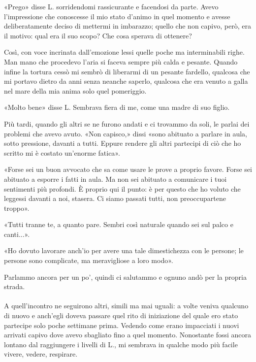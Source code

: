 \documentclass[a4paper,12pt]{book}
\begin{document}
«Prego» disse L. sorridendomi rassicurante e facendosi da parte. Avevo
l'impressione che conoscesse il mio stato d'animo in quel momento e avesse
deliberatamente deciso di mettermi in imbarazzo; quello che non capivo, però,
era il motivo: qual era il suo scopo? Che cosa sperava di ottenere?

Così, con voce incrinata dall'emozione lessi quelle poche ma interminabili
righe. Man mano che procedevo l'aria si faceva sempre più calda e pesante.
Quando infine la tortura cessò mi sembrò di liberarmi di un pesante fardello,
qualcosa che mi portavo dietro da anni senza neanche saperlo, qualcosa che era
venuto a galla nel mare della mia anima solo quel pomeriggio.

«Molto bene» disse L. Sembrava fiera di me, come una madre di suo figlio.

Più tardi, quando gli altri se ne furono andati e ci trovammo da soli, le
parlai dei problemi che avevo avuto. «Non capisco,» dissi «sono abituato a
parlare in aula, sotto pressione, davanti a tutti. Eppure rendere gli altri
partecipi di ciò che ho scritto mi è costato un'enorme fatica».

«Forse sei un buon avvocato che sa come usare le prove a proprio favore. Forse
sei abituato a esporre i fatti in aula. Ma non sei abituato a comunicare i tuoi
sentimenti più profondi. È proprio qui il punto: è per questo che ho voluto che
leggessi davanti a noi, stasera. Ci siamo passati tutti, non preoccupartene
troppo».

«Tutti tranne te, a quanto pare. Sembri così naturale quando sei sul palco e
canti...».

«Ho dovuto lavorare anch'io per avere una tale dimestichezza con le persone; le
persone sono complicate, ma meravigliose a loro modo».

Parlammo ancora per un po', quindi ci salutammo e ognuno andò per la propria
strada.

\paragraph{}
A quell'incontro ne seguirono altri, simili ma mai uguali: a volte veniva
qualcuno di nuovo e anch'egli doveva passare quel rito di iniziazione del
quale ero stato partecipe solo poche settimane prima. Vedendo come erano
impacciati i nuovi arrivati capivo dove avevo sbagliato fino a quel momento.
Nonostante fossi ancora lontano dal raggiungere i livelli di L., mi sembrava in
qualche modo più facile vivere, vedere, respirare.
\end{document}
